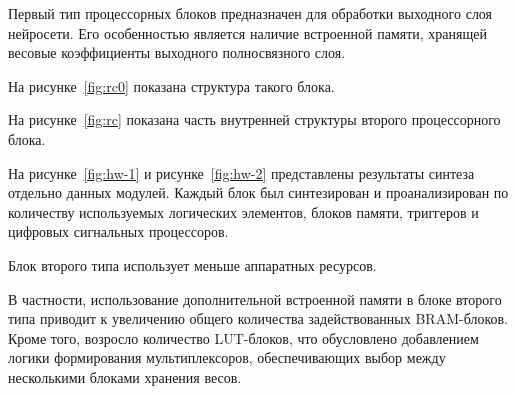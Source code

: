 Первый тип процессорных блоков предназначен для обработки выходного слоя 
нейросети. Его особенностью является наличие встроенной памяти, хранящей 
весовые коэффициенты выходного полносвязного слоя. 

На рисунке~\ref{fig:rc0} показана структура такого блока.


На рисунке~\ref{fig:rc} показана часть внутренней структуры второго 
процессорного блока. 


На рисунке~\ref{fig:hw-1} и рисунке~\ref{fig:hw-2} представлены результаты синтеза отдельно данных 
модулей. Каждый блок был синтезирован и проанализирован по количеству 
используемых логических элементов, блоков памяти, триггеров и цифровых 
сигнальных процессоров.


Блок второго типа использует меньше аппаратных ресурсов.


В частности, использование дополнительной встроенной памяти в блоке второго типа
приводит к увеличению общего количества задействованных BRAM-блоков. Кроме того, 
возросло количество LUT-блоков, что обусловлено добавлением логики формирования
мультиплексоров, обеспечивающих выбор между несколькими блоками хранения весов.




